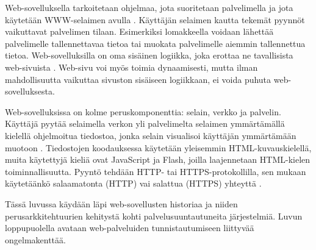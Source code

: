Web-sovelluksella tarkoitetaan ohjelmaa, jota suoritetaan palvelimella ja jota käytetään WWW-selaimen avulla \cite{uml}. Käyttäjän selaimen kautta tekemät pyynnöt vaikuttavat palvelimen tilaan. Esimerkiksi lomakkeella voidaan lähettää palvelimelle tallennettavaa tietoa tai muokata palvelimelle aiemmin tallennettua tietoa. Web-sovelluksilla on oma sisäinen logiikka, joka erottaa ne tavallisista web-sivuista \cite{uml}. Web-sivu voi myös toimia dynaamisesti, mutta ilman mahdollisuutta vaikuttaa sivuston sisäiseen logiikkaan, ei voida puhuta web-sovelluksesta.

Web-sovelluksissa on kolme peruskomponenttia: selain, verkko ja palvelin. Käyttäjä pyytää selaimella verkon yli palvelimelta selaimen ymmärtämällä kielellä ohjelmoitua tiedostoa, jonka selain visualisoi käyttäjän ymmärtämään muotoon \cite{uml}. Tiedostojen koodauksessa käytetään yleisemmin HTML-kuvauskielellä, muita käytettyjä kieliä ovat JavaScript ja Flash, joilla laajennetaan HTML-kielen toiminnallisuutta. Pyyntö tehdään HTTP- tai HTTPS-protokollilla, sen mukaan käytetäänkö salaamatonta (HTTP) vai salattua (HTTPS) yhteyttä \cite{rfc2818}.

Tässä luvussa käydään läpi web-sovellusten historiaa ja niiden perusarkkitehtuurien kehitystä kohti palvelusuuntautuneita järjestelmiä. Luvun loppupuolella avataan web-palveluiden tunnistautumiseen liittyvää ongelmakenttää.